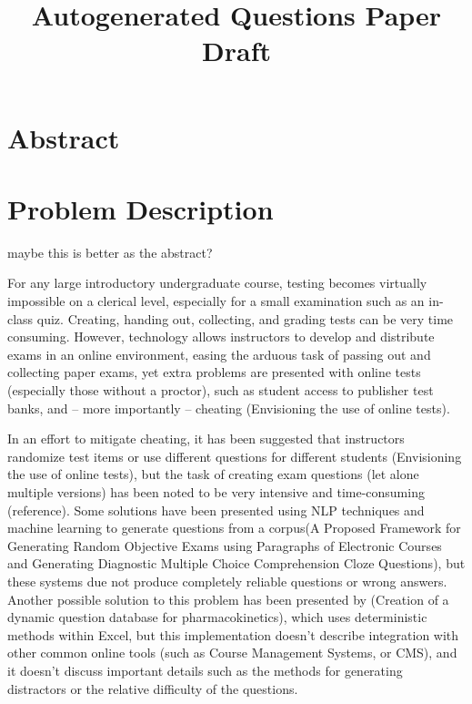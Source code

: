 \documentclass{article}
\title{Autogenerated Questions Paper Draft}
\date{ }
\begin{document}
\maketitle

\tableofcontents

\section{Abstract}

\section{Problem Description}

maybe this is better as the abstract?

For any large introductory undergraduate course, testing becomes virtually impossible on a clerical level, especially for a small examination
such as an in-class quiz. Creating, handing out, collecting, and grading tests can be very time consuming. However, technology allows instructors to develop and distribute exams in an online environment,
easing the arduous task of passing out and collecting paper exams, yet extra problems are presented with online tests (especially those
without a proctor), such as student access to publisher test banks, and -- more importantly -- cheating (Envisioning the use of online tests). 

In an effort to mitigate cheating, it has been suggested that instructors randomize test items or use different questions for different students (Envisioning the use of online tests), but the task of creating exam
questions (let alone multiple versions) has been noted to be very intensive and time-consuming (reference). Some solutions have been presented using NLP techniques and machine learning  to generate questions from a corpus(A Proposed Framework for Generating Random
Objective Exams using Paragraphs of Electronic
Courses and Generating Diagnostic Multiple Choice Comprehension Cloze Questions), but these systems due not produce completely reliable questions or wrong answers. Another possible solution to this problem has been
presented by (Creation of a dynamic question database for pharmacokinetics), which uses deterministic methods within Excel, but this implementation doesn't describe integration with other common online tools (such as Course Management Systems, or CMS), and it doesn't discuss important details such as
the methods for generating distractors or the relative difficulty of the questions.
\end{document}
